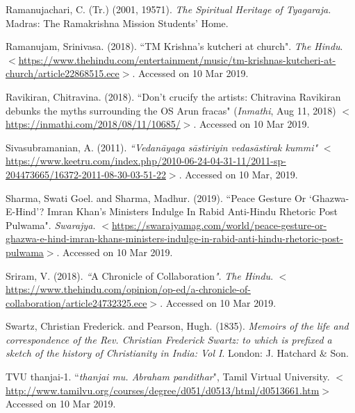\begin{thebibliography}{99}
  Ramanujachari, C. (Tr.) (2001, 19571). \textit{The Spiritual Heritage of Tyagaraja. }Madras: The Ramakrishna Mission Students' Home.

  Ramanujam, Srinivasa. (2018). ``TM Krishna's kutcheri at church". \textit{The Hindu}. $<$\url{https://www.thehindu.com/entertainment/music/tm-krishnas-kutcheri-at-church/article22868515.ece}$>$. Accessed on 10 Mar 2019.

  Ravikiran, Chitravina. (2018). ``Don't crucify the artists: Chitravina Ravikiran debunks the myths surrounding the OS Arun fracas" (\textit{Inmathi}, Aug 11, 2018) $<$\url{https://inmathi.com/2018/08/11/10685/}$>$. Accessed on 10 Mar 2019.

  Sivasubramanian, A. (2011). \textit{``Vedanāyaga sāstiriyin vedasāstirak kummi"} $<$\url{https://www.keetru.com/index.php/2010-06-24-04-31-11/2011-sp-204473665/16372-2011-08-30-03-51-22}$>$. Accessed on 10 Mar, 2019.

  Sharma, Swati Goel. and Sharma, Madhur. (2019). ``Peace Gesture Or `Ghazwa-E-Hind'? Imran Khan's Ministers Indulge In Rabid Anti-Hindu Rhetoric Post Pulwama". \textit{Swarajya.} $<$\url{https://swarajyamag.com/world/peace-gesture-or-ghazwa-e-hind-imran-khans-ministers-indulge-in-rabid-anti-hindu-rhetoric-post-pulwama}$>$. Accessed on 10 Mar 2019.

  Sriram, V. (2018). \textit{``}A Chronicle of Collaboration\textit{"}. \textit{The Hindu}. $<$\url{https://www.thehindu.com/opinion/op-ed/a-chronicle-of-collaboration/article24732325.ece}$>$. Accessed on 10 Mar 2019.

  Swartz, Christian Frederick. and Pearson, Hugh. (1835). \textit{Memoirs of the life and correspondence of the Rev. Christian Frederick Swartz: to which is prefixed a sketch of the history of Christianity in India: Vol I}. London: J. Hatchard \& Son.

  TVU thanjai-1. ``\textit{thanjai mu. Abraham pandithar}", Tamil Virtual University. $<$\url{http://www.tamilvu.org/courses/degree/d051/d0513/html/d0513661.htm}$>$ Accessed on 10 Mar 2019.

 \end{thebibliography}

\theendnotes





